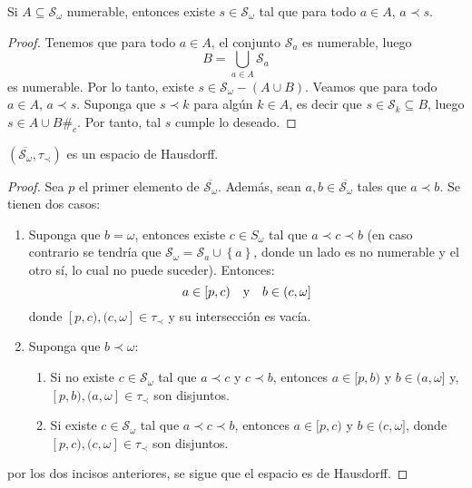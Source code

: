 \documentclass[12pt]{report}
\theoremstyle{largebreak}
\newcommand\contradiction{\ensuremath{\#_c}}
\newcommand{\Cls}[1]{\ensuremath{\overline{#1}}}
\begin{document}
    \begin{propo}
        Si $A\subseteq \mathcal{S}_\omega$ numerable, entonces existe $s\in\mathcal{S}_\omega$ tal que para todo $a\in A$, $a\prec s$.
    \end{propo}

    \begin{proof}
        Tenemos que para todo $a\in A$, el conjunto $\mathcal{S}_a$ es numerable, luego
        \begin{equation*}
            B=\bigcup_{ a\in A}\mathcal{S}_a
        \end{equation*}
        es numerable. Por lo tanto, existe $s\in\mathcal{S}_\omega-(A\cup B)$. Veamos que para todo $a\in A$, $a\prec s$. Suponga que $s\prec k$ para algún $k\in A$, es decir que $s\in \mathcal{S}_k\subseteq B$, luego $s\in A\cup B$\contradiction. Por tanto, tal $s$ cumple lo deseado.
    \end{proof}

    \begin{propo}
        $(\Cls{\mathcal{S}_\omega},\tau_\prec)$ es un espacio de Hausdorff.
    \end{propo}

    \begin{proof}
        Sea $p$ el primer elemento de $\Cls{\mathcal{S}_\omega}$. Además, sean $a,b\in\Cls{\mathcal{S}_\omega}$ tales que $a\prec b$. Se tienen dos casos:
        \begin{enumerate}
            \item Suponga que $b=\omega$, entonces existe $c\in S_\omega$ tal que $a\prec c\prec b$ (en caso contrario se tendría que $\mathcal{S}_\omega=\mathcal{S}_a\cup\left\{a\right\}$, donde un lado es no numerable y el otro sí, lo cual no puede suceder). Entonces:
            \begin{equation*}
                a\in [p,c)\quad\textup{y}\quad b\in(c,\omega]
            \end{equation*}
            donde $[p,c),(c,\omega]\in\tau_\prec$ y su intersección es vacía.
            \item Suponga que $b\prec\omega$:
            \begin{enumerate}
                \item Si no existe $c\in\mathcal{S}_\omega$ tal que $a\prec c$ y $c\prec b$, entonces $a\in [p,b)$ y $b\in (a,\omega]$ y, $[p,b),(a,\omega]\in\tau_\prec$ son disjuntos.
                \item Si existe $c\in\mathcal{S}_\omega$ tal que $a\prec c\prec b$, entonces $a\in [p,c)$ y $b\in (c,\omega]$, donde $[p,c),(c,\omega]\in\tau_\prec$ son disjuntos.
            \end{enumerate}
        \end{enumerate}
        por los dos incisos anteriores, se sigue que el espacio es de Hausdorff.
    \end{proof}
\end{document}
